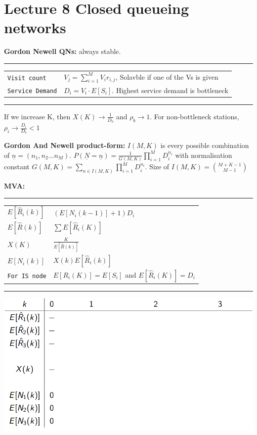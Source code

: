 \section{Lecture 8 Closed queueing networks}
\textbf{Gordon Newell QNs:} always stable.

\hrule
{}
\begin{tabular}{@{}p{\the\MyLen}@{}p{\linewidth-\the\MyLen}@{}}
\verb!Visit count!	&  $V_j = \sum^M_{i=1} V_ir_{i,j}$, Solavble if one of the Vs is given\\
\verb!Service Demand!	&  $D_i = V_i \cdot E[S_i]$. Highest service demand is bottleneck\\
\end{tabular}
\hrule
If we increase K, then $X(K) \rightarrow \frac{1}{D_b}$ and $\rho_b \rightarrow 1$. For non-bottleneck stations, $\rho_i \rightarrow \frac{D_i}{D_b} < 1$

\textbf{Gordon And Newell product-form:} $I(M,K)$ is every possible combination of $\underline{n} = (n_1, n_2 ... n_M)$. $P(\underline{N} = \underline{n}) = \frac{1}{G(M,K)} \prod^M_{i=1} D_i^{n_i}$ with normalisation constant $G(M,K) = \sum_{n \in I(M,K)} \prod_{i=1}^M D_i^{n_i}$. Size of $I(M,K) = {M+K-1 \choose M-1}$

\textbf{MVA:} 

\hrule
{}
\begin{tabular}{@{}p{\the\MyLen}@{}p{\linewidth-\the\MyLen}@{}}
$E[\hat{R}_i(k)]$ 	&  $(E[N_i(k-1)] + 1)D_i$\\
$E[\hat{R}(k)]$ 	&  $\sum E[\hat{R}_i(K)]$\\
$X(K)$ 				&  $\frac{K}{E[\hat{R}(k)]}$\\
$E[N_i(k)]$ 		&  $X(k)E[\hat{R}_i(k)]$\\
\verb!For IS node!  &  $E[R_i(K)] = E[S_i]$ and $E[\hat{R}_i(K)] = D_i$
\end{tabular}
\newline
\hrule
\includegraphics[scale=0.25]{images/MVA.png}

